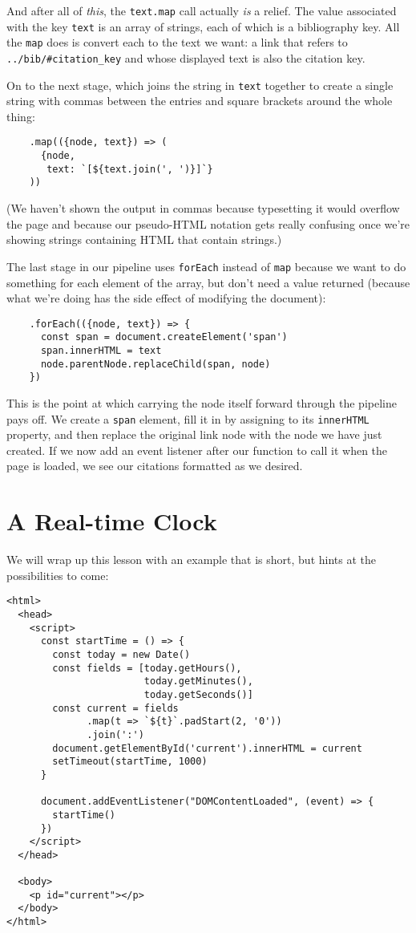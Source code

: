 And after all of \emph{this},
the \texttt{text.map} call actually \emph{is} a relief.
The value associated with the key \texttt{text} is an array of strings,
each of which is a bibliography key.
All the \texttt{map} does is convert each to the text we want:
a link that refers to \texttt{../bib/\#citation\_key} and whose displayed text is also the citation key.

On to the next stage,
which joins the string in \texttt{text} together to create a single string
with commas between the entries
and square brackets around the whole thing:

\begin{verbatim}
    .map(({node, text}) => (
      {node,
       text: `[${text.join(', ')}]`}
    ))
\end{verbatim}

\noindent
(We haven't shown the output in commas because typesetting it would overflow the page
and because our pseudo-HTML notation gets really confusing
once we're showing strings containing HTML that contain strings.)

The last stage in our pipeline uses \texttt{forEach} instead of \texttt{map}
because we want to do something for each element of the array,
but don't need a value returned
(because what we're doing has the side effect of modifying the document):

\begin{verbatim}
    .forEach(({node, text}) => {
      const span = document.createElement('span')
      span.innerHTML = text
      node.parentNode.replaceChild(span, node)
    })
\end{verbatim}

This is the point at which carrying the node itself forward through the pipeline pays off.
We create a \texttt{span} element,
fill it in by assigning to its \texttt{innerHTML} property,
and then replace the original link node with the node we have just created.
If we now add an event listener after our function to call it when the page is loaded,
we see our citations formatted as we desired.

\section{A Real-time Clock}\label{s:pages-clock}

We will wrap up this lesson with an example that is short,
but hints at the possibilities to come:

\begin{verbatim}
<html>
  <head>
    <script>
      const startTime = () => {
        const today = new Date()
        const fields = [today.getHours(),
                        today.getMinutes(),
                        today.getSeconds()]
        const current = fields
              .map(t => `${t}`.padStart(2, '0'))
              .join(':')
        document.getElementById('current').innerHTML = current
        setTimeout(startTime, 1000)
      }

      document.addEventListener("DOMContentLoaded", (event) => {
        startTime()
      })
    </script>
  </head>

  <body>
    <p id="current"></p>
  </body>
</html>
\end{verbatim}

